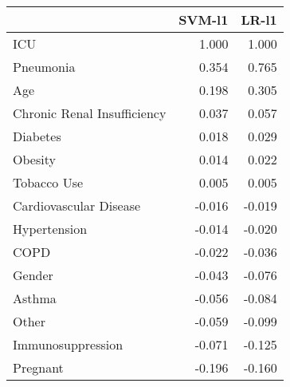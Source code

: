 \begin{tabular}{lrr}
\toprule
{} &  SVM-l1 &  LR-l1 \\
\midrule
ICU                         &   1.000 &  1.000 \\
Pneumonia                   &   0.354 &  0.765 \\
Age                         &   0.198 &  0.305 \\
Chronic Renal Insufficiency &   0.037 &  0.057 \\
Diabetes                    &   0.018 &  0.029 \\
Obesity                     &   0.014 &  0.022 \\
Tobacco Use                 &   0.005 &  0.005 \\
Cardiovascular Disease      &  -0.016 & -0.019 \\
Hypertension                &  -0.014 & -0.020 \\
COPD                        &  -0.022 & -0.036 \\
Gender                      &  -0.043 & -0.076 \\
Asthma                      &  -0.056 & -0.084 \\
Other                       &  -0.059 & -0.099 \\
Immunosuppression           &  -0.071 & -0.125 \\
Pregnant                    &  -0.196 & -0.160 \\
\bottomrule
\end{tabular}
